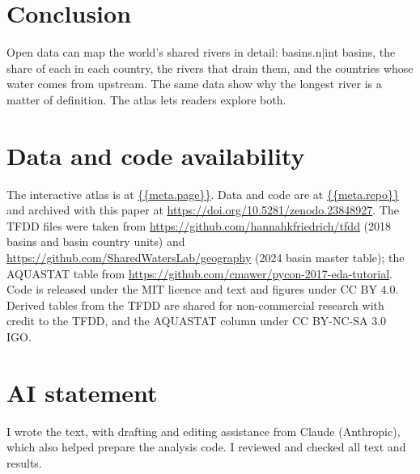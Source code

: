 \documentclass[11pt,a4paper]{article}
\begin{document}
\section{Conclusion}
Open data can map the world's shared rivers in detail: {{basins.n|int}} basins, the share of each in each country, the rivers that drain them, and the countries whose water comes from upstream. The same data show why the longest river is a matter of definition. The atlas lets readers explore both.

\section*{Data and code availability}
The interactive atlas is at \url{{{meta.page}}}. Data and code are at \url{{{meta.repo}}} and archived with this paper at \href{https://doi.org/10.5281/zenodo.23848927}{https://doi.org/10.5281/zenodo.23848927}. The TFDD files were taken from \url{https://github.com/hannahkfriedrich/tfdd} (2018 basins and basin country units) and \url{https://github.com/SharedWatersLab/geography} (2024 basin master table); the AQUASTAT table from \url{https://github.com/cmawer/pycon-2017-eda-tutorial}. Code is released under the MIT licence and text and figures under CC BY 4.0. Derived tables from the TFDD are shared for non-commercial research with credit to the TFDD, and the AQUASTAT column under CC BY-NC-SA 3.0 IGO.

\section*{AI statement}
I wrote the text, with drafting and editing assistance from Claude (Anthropic), which also helped prepare the analysis code. I reviewed and checked all text and results.
\end{document}
